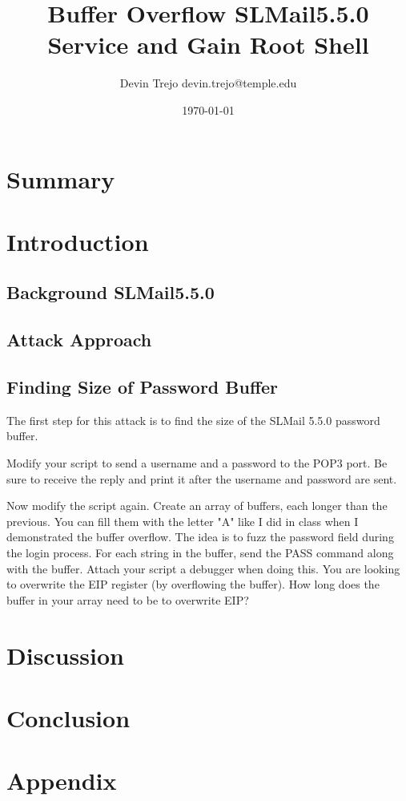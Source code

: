 \documentclass[12pt]{article}
\begin{document}
\title{Buffer Overflow SLMail5.5.0 Service and Gain Root Shell}
\author{Devin Trejo \tabularnewline devin.trejo@temple.edu }
\date{\today}
\maketitle

\section{Summary}
\label{sect:summary}


\section{Introduction}
\label{sect:intro}
\subsection{Background SLMail5.5.0}
\label{sec:background}

\subsection{Attack Approach}
\label{sec:approach}
\subsection{Finding Size of Password Buffer}
\label{sec:approachpassbuff}
The first step for this attack is to find the size of the SLMail 5.5.0
password buffer.

Modify your script to send a username and a password to the POP3 port.  
Be sure to receive the reply and print it after the username and password 
are sent.

Now modify the script again.  Create an array of buffers, each longer than 
the previous.  You can fill them with the letter "A" like I did in class 
when I demonstrated the buffer overflow.  The idea is to fuzz the password 
field during the login process.  For each string in the buffer, send the 
PASS command along with the buffer.  Attach your script a debugger when 
doing this.  You are looking to overwrite the EIP register (by overflowing 
the buffer).  How long does the buffer in your array need to be to
overwrite EIP?


\section{Discussion}
\label{sect:discussion}


\section{Conclusion}
\label{sect:conclusion}


\nocite{*}



\section*{Appendix}
\label{sect:appendix}
\end{document}
